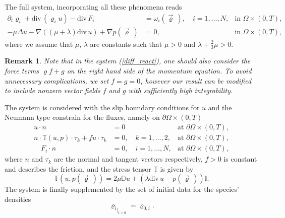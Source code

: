 \documentclass[11pt]{article}
\newcommand{\ddiv}{\mathrm{div\,}}
\newtheorem{rem}[tw]{Remark}
\numberwithin{equation}{section}
\numberwithin{tw}{section}
\begin{document}
The full system, incorporating all these phenomena reads
\begin{equation}\label{diff_react}
    \begin{aligned}
    \partial_t\varrho_{i} + \ddiv(\varrho_{i} u) -\ddiv F_i &= \omega_{i}(\vec\varrho\,), \quad i=1,\dots,N , & \mbox{in \ }\Omega \times (0,T),\\
   -\mu\Delta u -\nabla((\mu+\lambda)\ddiv u) + \nabla p(\vec\varrho\,) &= 0, & \mbox{in \ } \Omega \times (0,T),
    \end{aligned}
\end{equation}
where we assume that $\mu$, $\lambda$ are constants such that $\mu>0$ and $\lambda + \frac{2}{3}\mu >0$.
\begin{rem}
    Note that in the system (\ref{diff_react}), one should also consider the force terms $\varrho f+ g$ on the right hand side of the momentum equation. To avoid unnecessary complications, we set $f=g=0$, however our result can be modified to include nonzero vector fields $f$ and $g$ with sufficiently high integrability.
\end{rem}


The system is considered with the slip boundary conditions for $u$ and the Neumann type constrain for the fluxes, namely on $\partial\Omega \times (0,T)$ 
\begin{equation}\label{slip}
    \begin{aligned}
    u\cdot n &= 0  & \mbox{at \ } \partial \Omega \times (0,T),\\
    n\cdot \mathbb{T}(u,p)\cdot\tau_k + fu\cdot\tau_k &= 0, \quad k=1,\dots,2, & \mbox{at \ } \partial \Omega
    \times (0,T),\\
    \quad F_i\cdot n & = 0, \quad i=1,...,N,& \mbox{at \ } \partial \Omega \times (0,T),
    \end{aligned}
\end{equation}
where $n$ and $\tau_k$ are the normal and tangent vectors respectively, $f> 0$ is constant and describes the friction, and the stress tensor $\mathbb{T}$ is given by
\[ \mathbb{T}(u,p(\vec \varrho\,))=2\mu\mathbb{D}u+(\lambda\ddiv u-p(\vec \varrho\,))\mathbb{I}. \]
%
The system is finally supplemented by the set of initial data for the species' densities
\[ {\varrho_{i}}_{|_{t=0}} = \varrho_{0,i}. 
\]
\end{document}
